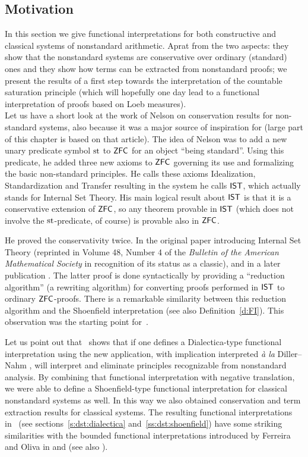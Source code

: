 \subsection*{Motivation}

In this section we give functional interpretations for both constructive and classical systems of nonstandard arithmetic. 
Aprat from the two aspects: they show that the nonstandard systems are conservative over ordinary (standard) ones and they show how terms can be extracted from nonstandard proofs; we present the results of a first step towards the interpretation of the countable saturation principle (which will hopefully one day lead to a functional interpretation of proofs based on Loeb measures).\\

Let us have a short look at the work of Nelson on conservation results for non-standard systems, also because it was a major source of inspiration for \cite{BBS12} (large part of this chapter is based on that article). The idea of Nelson was to add a new unary predicate symbol $\operatorname{st}$ to $\textsf{\upshape ZFC}$ for an object ``being standard''. Using this predicate, he added three new axioms to $\textsf{\upshape ZFC}$ governing its use and 
formalizing the basic non-standard principles. He calls these axioms Idealization, Standardization and Transfer resulting in the system he calls $\textsf{\upshape IST}$, which actually stands for Internal Set Theory. His main logical result about $\textsf{\upshape IST}$ is that it is a conservative extension of $\textsf{\upshape ZFC}$, so any theorem provable in $\textsf{\upshape IST}$ (which does not involve the $\operatorname{st}$-predicate, of course) is provable also in $\textsf{\upshape ZFC}$. 

He proved the conservativity twice. In the original paper introducing Internal Set Theory \cite{nelson77} (reprinted in Volume 48, Number 4 of the \emph{Bulletin of the American Mathematical Society} in recognition of its status as a classic), and in a later publication \cite{nelson88}. The latter proof is done syntactically by providing a ``reduction algorithm'' (a rewriting algorithm) for converting proofs performed in ${\textsf{\upshape IST}}$ to ordinary ${\textsf{\upshape ZFC}}$-proofs. There is a remarkable similarity between this reduction algorithm and the Shoenfield interpretation \cite{shoenfield01} (see also Definition~\ref{d:FI}). This observation was the starting point for~\cite{BBS12}.

Let us point out that~\cite{BBS12} shows that if one defines a Dialectica-type functional interpretation using the new application, with implication interpreted \emph{\`a la} Diller--Nahm \cite{dillernahm74}, will interpret and eliminate principles recognizable from nonstandard analysis. By combining that functional interpretation with negative translation, we were able to define a Shoenfield-type functional interpretation for classical nonstandard systems as well. In this way we also obtained conservation and term extraction results for classical systems. The resulting functional interpretations in~\cite{BBS12} (see sections~\ref{s:dst:dialectica} and~\ref{ss:dst:shoenfield}) have some striking similarities with the bounded functional interpretations introduced by Ferreira and Oliva in \cite{ferreiraoliva05} and \cite{ferreira09} (see also \cite{gaspar09}).
